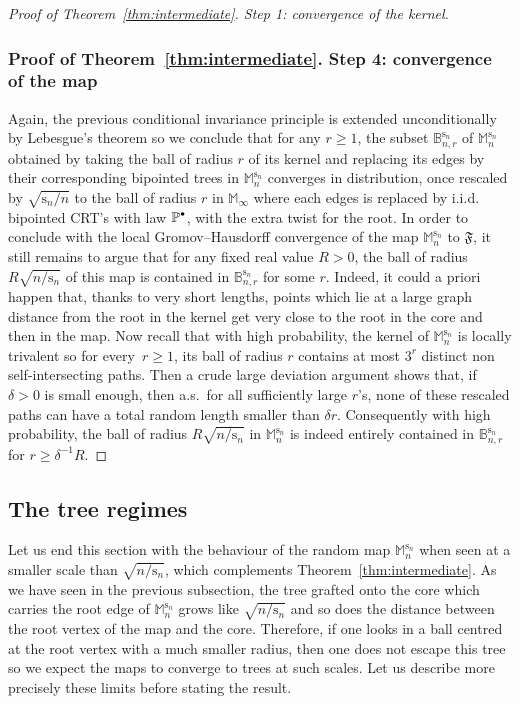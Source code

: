\documentclass[10pt]{amsart}
\newcommand{\sbullet}{{\raisebox{1pt}{$\scriptscriptstyle\bullet $}}}
\theoremstyle{plain}
\theoremstyle{definition}
\theoremstyle{remark}
\renewcommand{\P}{\mathbb{P}}
\newcommand{\Mapb}{\mathbb{M}}
\newcommand{\spar}{\mathrm{s}}
\begin{document}
\begin{proof}[Proof of Theorem~\ref{thm:intermediate}. Step 1: convergence of the kernel]
\subsubsection*{Proof of Theorem~\ref{thm:intermediate}. Step 4: convergence of the map}\enlargethispage{.5\baselineskip}%
Again, the previous conditional invariance principle is extended unconditionally by Lebesgue's theorem so we conclude that for any $r\ge 1$, the subset $\mathbb{B}_{n,r}^{\spar_n}$ of $\Mapb_n^{\spar_n}$ obtained by taking the ball of radius $r$ of its kernel and replacing its edges by their corresponding bipointed trees in $\Mapb_n^{\spar_n}$ converges in distribution, once rescaled by $\sqrt{\spar_n/n}$ to the ball of radius $r$ in $\Mapb_\infty$ where each edges is replaced by i.i.d. bipointed CRT's with law $\P^{\sbullet}$, with the extra twist for the root.
In order to conclude with the local Gromov--Hausdorff convergence of the map $\Mapb_n^{\spar_n}$ to $\mathfrak{F}$, it still remains to argue that for any fixed real value $R>0$, the ball of radius $R \sqrt{n/\spar_n}$ of this map is contained in $\mathbb{B}_{n,r}^{\spar_n}$ for some $r$. Indeed, it could a priori happen that, thanks to very short lengths, points which lie at a large graph distance from the root in the kernel get very close to the root in the core and then in the map.
Now recall that with high probability, the kernel of $\Mapb_n^{\spar_n}$ is locally trivalent so for every~$r \ge 1$, its ball of radius $r$ contains at most $3^{r}$ distinct non self-intersecting paths. Then a crude large deviation argument shows that, if $\delta>0$ is small enough, then a.s.~for all sufficiently large $r$'s, none of these rescaled paths can have a total random length smaller than $\delta r$. Consequently with high probability, the ball of radius $R \sqrt{n/\spar_n}$ in $\Mapb_n^{\spar_n}$ is indeed entirely contained in $\mathbb{B}_{n,r}^{\spar_n}$ for $r \ge \delta^{-1} R$.
\end{proof}

\subsection{The tree regimes}
\label{ssec:limites_abres}

Let us end this section with the behaviour of the random map $\Mapb_n^{\spar_n}$ when seen at a smaller scale than $\sqrt{n/\spar_n}$, which complements Theorem~\ref{thm:intermediate}. As we have seen in the previous subsection, the tree grafted onto the core which carries the root edge of $\Mapb_n^{\spar_n}$ grows like $\sqrt{n/\spar_n}$ and so does the distance between the root vertex of the map and the core. Therefore, if one looks in a ball centred at the root vertex with a much smaller radius, then one does not escape this tree so we expect the maps to converge to trees at such scales. Let us describe more precisely these limits before stating the result.
\end{document}
